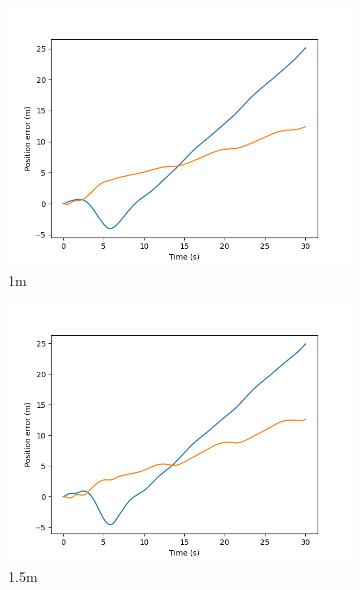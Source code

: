 \documentclass[class=article, crop=false]{standalone}
\begin{document}
\begin{figure}
\begin{subfigure}[b]{0.48\textwidth}
        \includegraphics{scenario1/rov-50m/1.0m/usv_pos_error_uncontrolled}
        \caption{1m}
        \label{}
    \end{subfigure}
    \hfill
        \begin{subfigure}[b]{0.48\textwidth}
        \centering
        \includegraphics{scenario1/rov-50m/1.5m/usv_pos_error_uncontrolled}
        \caption{1.5m}
        \label{}
    \end{subfigure}
    \vfill
        \begin{subfigure}[b]{0.48\textwidth}
        \centering

\end{subfigure}
\end{figure}
\end{document}
